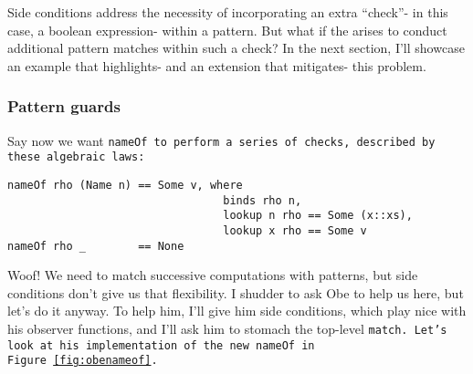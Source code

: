 \documentclass[manuscript,screen,review, 12pt]{acmart}
\begin{document}
    Side conditions address the necessity of incorporating an extra “check”- in
    this case, a boolean expression- within a pattern. But what if the 
    arises to conduct additional pattern matches within such a check? In the
    next section, I'll showcase an example that highlights- and an extension
    that mitigates- this problem. 
    
    \subsubsection{Pattern guards}
    \label{guards}
    
    Say now we want \tt{nameOf} to perform a series of checks, described by
    these algebraic laws: 

    \begin{minipage}[t]{\textwidth}
        \centering 
        \begin{verbatim}
nameOf rho (Name n) == Some v, where 
                                 binds rho n, 
                                 lookup n rho == Some (x::xs),
                                 lookup x rho == Some v
nameOf rho _        == None 
        \end{verbatim}
    \end{minipage}




    
    

    Woof! We need to match successive computations with patterns, but side
    conditions don't give us that flexibility. I shudder to ask Obe to help us
    here, but let's do it anyway. To help him, I'll give him side conditions,
    which play nice with his observer functions, and I'll ask him to stomach the
    top-level \tt{match}. Let's look at his implementation of the new
    \tt{nameOf} in Figure~\ref{fig:obenameof}.
\end{document}
